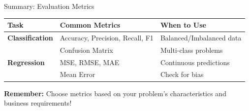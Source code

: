 \documentclass[usenames,dvipsnames]{beamer}
\begin{document}
\begin{frame}{Summary: Evaluation Metrics}
\begin{center}
\begin{tabular}{|l|l|l|}
\hline
\textbf{Task} & \textbf{Common Metrics} & \textbf{When to Use} \\
\hline
\textbf{Classification} & Accuracy, Precision, Recall, F1 & Balanced/Imbalanced data \\
 & Confusion Matrix & Multi-class problems \\
\hline
\textbf{Regression} & MSE, RMSE, MAE & Continuous predictions \\
 & Mean Error & Check for bias \\
\hline
\end{tabular}
\end{center}

\vspace{1cm}
\textbf{Remember:} Choose metrics based on your problem's characteristics and business requirements!
\end{frame}
\end{document}
